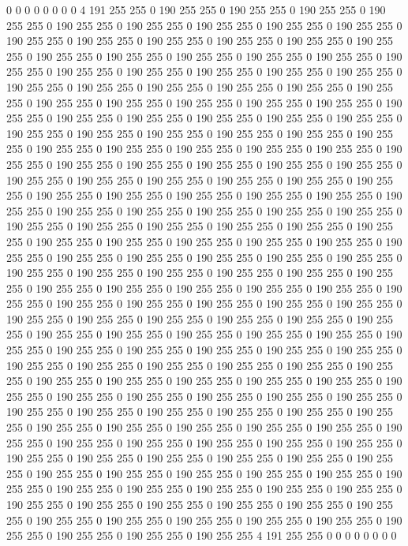0 0 0 0 0 0 0 0 4 191 255 255 0 190 255 255 0 190 255 255 0 190 255 255 0 190 255 255 0 190 255 255 0 190 255 255 0 190 255 255 0 190 255 255 0 190 255 255 0 190 255 255 0 190 255 255 0 190 255 255 0 190 255 255 0 190 255 255 0 190 255 255 0 190 255 255 0 190 255 255 0 190 255 255 0 190 255 255 0 190 255 255 0 190 255 255 0 190 255 255 0 190 255 255 0 190 255 255 0 190 255 255 0 190 255 255 0 190 255 255 0 190 255 255 0 190 255 255 0 190 255 255 0 190 255 255 0 190 255 255 0 190 255 255 0 190 255 255 0 190 255 255 0 190 255 255 0 190 255 255 0 190 255 255 0 190 255 255 0 190 255 255 0 190 255 255 0 190 255 255 0 190 255 255 0 190 255 255 0 190 255 255 0 190 255 255 0 190 255 255 
0 190 255 255 0 190 255 255 0 190 255 255 0 190 255 255 0 190 255 255 0 190 255 255 0 190 255 255 0 190 255 255 0 190 255 255 0 190 255 255 0 190 255 255 0 190 255 255 0 190 255 255 0 190 255 255 0 190 255 255 0 190 255 255 0 190 255 255 0 190 255 255 0 190 255 255 0 190 255 255 0 190 255 255 0 190 255 255 0 190 255 255 0 190 255 255 0 190 255 255 0 190 255 255 0 190 255 255 0 190 255 255 0 190 255 255 0 190 255 255 0 190 255 255 0 190 255 255 0 190 255 255 0 190 255 255 0 190 255 255 0 190 255 255 0 190 255 255 0 190 255 255 0 190 255 255 0 190 255 255 0 190 255 255 0 190 255 255 0 190 255 255 0 190 255 255 0 190 255 255 0 190 255 255 0 190 255 255 0 190 255 255 0 190 255 255 0 190 255 255 
0 190 255 255 0 190 255 255 0 190 255 255 0 190 255 255 0 190 255 255 0 190 255 255 0 190 255 255 0 190 255 255 0 190 255 255 0 190 255 255 0 190 255 255 0 190 255 255 0 190 255 255 0 190 255 255 0 190 255 255 0 190 255 255 0 190 255 255 0 190 255 255 0 190 255 255 0 190 255 255 0 190 255 255 0 190 255 255 0 190 255 255 0 190 255 255 0 190 255 255 0 190 255 255 0 190 255 255 0 190 255 255 0 190 255 255 0 190 255 255 0 190 255 255 0 190 255 255 0 190 255 255 0 190 255 255 0 190 255 255 0 190 255 255 0 190 255 255 0 190 255 255 0 190 255 255 0 190 255 255 0 190 255 255 0 190 255 255 0 190 255 255 0 190 255 255 0 190 255 255 0 190 255 255 0 190 255 255 0 190 255 255 0 190 255 255 0 190 255 255 
0 190 255 255 0 190 255 255 0 190 255 255 0 190 255 255 0 190 255 255 0 190 255 255 0 190 255 255 0 190 255 255 0 190 255 255 0 190 255 255 0 190 255 255 0 190 255 255 0 190 255 255 0 190 255 255 0 190 255 255 0 190 255 255 0 190 255 255 0 190 255 255 0 190 255 255 0 190 255 255 0 190 255 255 0 190 255 255 0 190 255 255 0 190 255 255 0 190 255 255 0 190 255 255 0 190 255 255 0 190 255 255 0 190 255 255 0 190 255 255 0 190 255 255 0 190 255 255 0 190 255 255 0 190 255 255 0 190 255 255 0 190 255 255 0 190 255 255 0 190 255 255 0 190 255 255 0 190 255 255 0 190 255 255 0 190 255 255 0 190 255 255 0 190 255 255 0 190 255 255 0 190 255 255 0 190 255 255 4 191 255 255 0 0 0 0 0 0 0 0 
